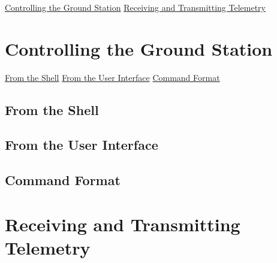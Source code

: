 \hyperlink{controlling_the_ground_station}{Controlling the Ground Station} \hyperlink{receiving_telemetry}{Receiving and Transmitting Telemetry} \hypertarget{controlling_the_ground_station}{}\section{Controlling the Ground Station}\label{controlling_the_ground_station}
\hyperlink{control_from_shell}{From the Shell} \hyperlink{control_from_ui}{From the User Interface} \hyperlink{command_format}{Command Format} \hypertarget{control_from_shell}{}\subsection{From the Shell}\label{control_from_shell}
\hypertarget{control_from_ui}{}\subsection{From the User Interface}\label{control_from_ui}
\hypertarget{command_format}{}\subsection{Command Format}\label{command_format}
\hypertarget{receiving_telemetry}{}\section{Receiving and Transmitting Telemetry}\label{receiving_telemetry}
